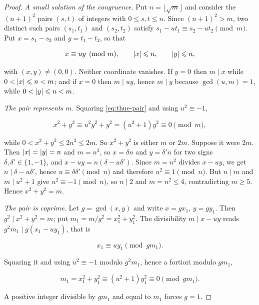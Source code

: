 \begin{proof}
\emph{A small solution of the congruence.} Put $n=\lfloor\sqrt m\rfloor$ and
consider the $(n+1)^2$ pairs $(s,t)$ of integers with $0\leqslant s,t\leqslant n$.
Since $(n+1)^2>m$, two distinct such pairs $(s_1,t_1)$ and $(s_2,t_2)$ satisfy
$s_1-ut_1\equiv s_2-ut_2\pmod m$. Put $x=s_1-s_2$ and $y=t_1-t_2$, so that

\begin{equation}
 x\equiv uy\pmod m,
 \qquad
 \lvert x\rvert\leqslant n,
 \qquad
 \lvert y\rvert\leqslant n,
 \label{eq:thue-pair}
\end{equation}

with $(x,y)\neq(0,0)$. Neither coordinate vanishes. If $y=0$ then $m\mid x$
while $0<\lvert x\rvert\leqslant n<m$; and if $x=0$ then $m\mid uy$, hence $m\mid y$
because $\gcd(u,m)=1$, while $0<\lvert y\rvert\leqslant n<m$.

\emph{The pair represents $m$.} Squaring \cref{eq:thue-pair} and using
$u^2\equiv-1$,

\begin{equation}
 x^2+y^2\equiv u^2y^2+y^2=(u^2+1)y^2\equiv0\pmod m,
\end{equation}

while $0<x^2+y^2\leqslant2n^2\leqslant2m$. So $x^2+y^2$ is either $m$ or $2m$.
Suppose it were $2m$. Then $\lvert x\rvert=\lvert y\rvert=n$ and $m=n^2$, so $x=\delta n$ and
$y=\delta'n$ for two signs $\delta,\delta'\in\{1,-1\}$, and
$x-uy=n(\delta-u\delta')$. Since $m=n^2$ divides $x-uy$, we get
$n\mid\delta-u\delta'$, hence $u\equiv\delta\delta'\pmod n$ and therefore
$u^2\equiv1\pmod n$. But $n\mid m$ and $m\mid u^2+1$ give $u^2\equiv-1\pmod n$,
so $n\mid2$ and $m=n^2\leqslant4$, contradicting $m\geqslant5$. Hence
$x^2+y^2=m$.

\emph{The pair is coprime.} Let $g=\gcd(x,y)$ and write $x=gx_1$, $y=gy_1$.
Then $g^2\mid x^2+y^2=m$; put $m_1=m/g^2=x_1^2+y_1^2$. The divisibility
$m\mid x-uy$ reads $g^2m_1\mid g(x_1-uy_1)$, that is

\begin{equation}
 x_1\equiv uy_1\pmod{gm_1}.
\end{equation}

Squaring it and using $u^2\equiv-1$ modulo $g^2m_1$, hence a fortiori modulo
$gm_1$,

\begin{equation}
 m_1=x_1^2+y_1^2\equiv(u^2+1)y_1^2\equiv0\pmod{gm_1}.
\end{equation}

A positive integer divisible by $gm_1$ and equal to $m_1$ forces $g=1$.


\end{proof}
